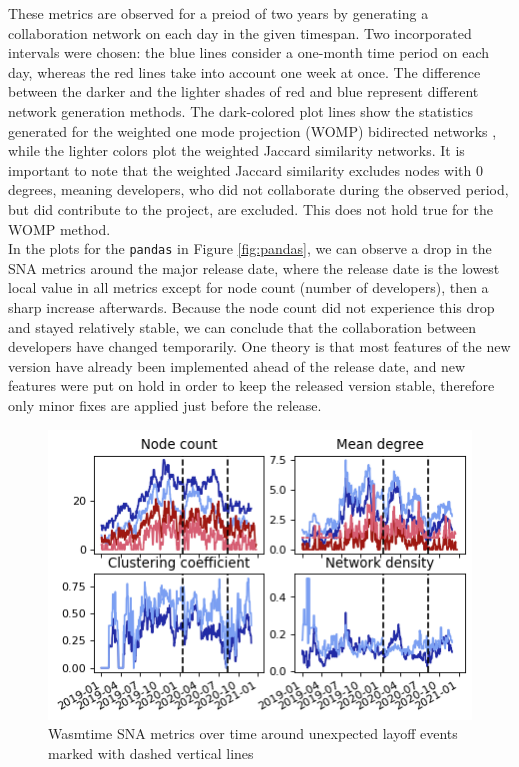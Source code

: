 These metrics are observed for a preiod of two years by generating a collaboration network on each day in the given timespan. Two incorporated intervals were chosen: the blue lines consider a one-month time period on each day, whereas the red lines take into account one week at once. The difference between the darker and the lighter shades of red and blue represent different network generation methods. The dark-colored plot lines show the statistics generated for the weighted one mode projection (WOMP) bidirected networks \cite{stramWeightedOneMode2017}, while the lighter colors plot the weighted Jaccard similarity networks. It is important to note that the weighted Jaccard similarity excludes nodes with 0 degrees, meaning developers, who did not collaborate during the observed period, but did contribute to the project, are excluded. This does not hold true for the WOMP method. \\

In the plots for the \texttt{pandas} in Figure \ref{fig:pandas}, we can observe a drop in the SNA metrics around the major release date, where the release date is the lowest local value in all metrics except for node count (number of developers), then a sharp increase afterwards. Because the node count did not experience this drop and stayed relatively stable, we can conclude that the collaboration between developers have changed temporarily. One theory is that most features of the new version have already been implemented ahead of the release date, and new features were put on hold in order to keep the released version stable, therefore only minor fixes are applied just before the release. \\

\begin{figure}[h!]
    \centering
    \includegraphics{figures/wasmtime.png}
    \caption{Wasmtime SNA metrics over time around unexpected layoff events marked with dashed vertical lines}
    \label{fig:wasmtime}
\end{figure}

